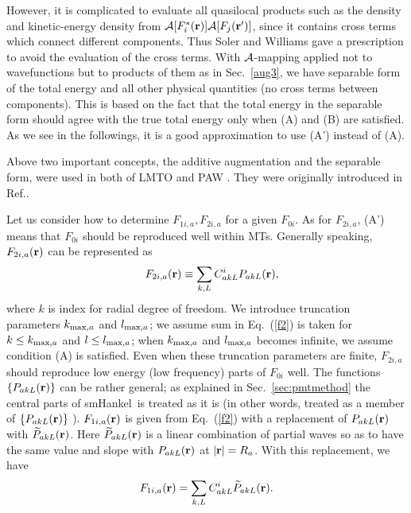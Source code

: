 \documentclass[a4paper,10pt,aip,onecolumn,amsmath,amssymb,floatfix,rmp]{revtex4-1}
\newcommand{\bfr}{{\bf r}}
\newcommand{\refeq}[1]{Eq.~(\ref{#1})}
\def\calR{{\cal A}}
\newcommand{\req}[1]{\mbox{Eq.~\!(\ref{#1})}}
\newcommand{\refsec}[1]{\mbox{Sec.~\!\ref{#1}}}
\def\smh{smHankel}
\def\wPakL{\widetilde{P}_{akL}}
\def\CiakL{C^i_{akL}}
\begin{document}
However, it is complicated to evaluate all quasilocal 
products such as the density and kinetic-energy density
from $\calR[F^*_i(\bfr)]\calR[F_j(\bfr')]$,
since it contains cross terms which connect different components.
Thus Soler and Williams \cite{soler89} 
gave a prescription to avoid the evaluation of the cross terms.
With $\calR$-mapping applied not to wavefunctions
but to products of them as in \refsec{aug3},
we have {separable form} of the 
total energy and all other physical quantities 
(no cross terms between components). This is based on the fact that
the total energy in the {separable form} should 
agree with the true total energy only when (A) and (B) are satisfied. 
As we see in the followings, it is a good approximation to use (A') instead of (A). 

Above two important concepts, 
the additive augmentation and the separable form, 
were used in both of LMTO and PAW \cite{lmfchap,PAW,kresse99}.
They were originally introduced in Ref..

Let us consider how to determine $F_{1i,a},F_{2i,a}$ for
a given $F_{0i}$. As for $F_{2i,a}$, (A') means that 
$F_{0i}$ should be reproduced well within MTs.
Generally speaking, $F_{2i,a}(\bfr)$ can be represented as
\begin{eqnarray}
&&F_{2i,a}(\bfr) \equiv \sum_{k,L} \CiakL P_{akL}(\bfr), \label{f2}
\end{eqnarray}
where $k$ is index for radial degree of freedom. 
We introduce truncation parameters
$k_{{\rm max},a}$ and $l_{{\rm max},a}$; we assume 
sum in \req{f2} is taken for $k\le k_{{\rm max},a}$ and $l \le l_{{\rm max},a}$;
when $k_{{\rm max},a}$ and $l_{{\rm max},a}$ becomes infinite, we assume
condition (A) is satisfied. Even when these truncation
parameters are finite, $F_{2i,a}$ should reproduce
low energy (low frequency) parts of $F_{0i}$ well. 
The functions $\{P_{akL}(\bfr)\}$ can be rather general; 
as explained in \refsec{sec:pmtmethod}
the central parts of \smh\ is treated as it is
(in other words, treated as a member of $\{P_{akL}(\bfr)\}$ \cite{privatemark1}).
$F_{1i,a}(\bfr)$ is given from \refeq{f2}
with a replacement of ${P}_{akL}(\bfr)$ with $\widetilde{P}_{akL}(\bfr)$.
Here $\widetilde{P}_{akL}(\bfr)$ is a linear combination of
partial waves so as to have the same value and slope with
${P}_{akL}(\bfr)$ at $|\bfr|=R_a$. With this replacement, we have 
\begin{eqnarray}
F_{1i,a}(\bfr) = \sum_{k,L} C^i_{akL} \wPakL(\bfr). \label{f1}
\end{eqnarray}
\end{document}
